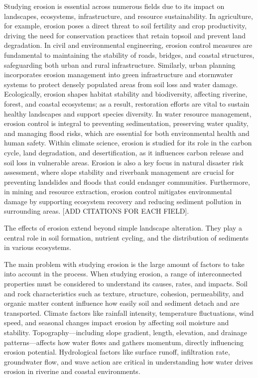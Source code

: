 Studying erosion is essential across numerous fields due to its impact on landscapes, ecosystems, infrastructure, and resource sustainability. In agriculture, for example, erosion poses a direct threat to soil fertility and crop productivity, driving the need for conservation practices that retain topsoil and prevent land degradation. In civil and environmental engineering, erosion control measures are fundamental to maintaining the stability of roads, bridges, and coastal structures, safeguarding both urban and rural infrastructure. Similarly, urban planning incorporates erosion management into green infrastructure and stormwater systems to protect densely populated areas from soil loss and water damage. Ecologically, erosion shapes habitat stability and biodiversity, affecting riverine, forest, and coastal ecosystems; as a result, restoration efforts are vital to sustain healthy landscapes and support species diversity. In water resource management, erosion control is integral to preventing sedimentation, preserving water quality, and managing flood risks, which are essential for both environmental health and human safety. Within climate science, erosion is studied for its role in the carbon cycle, land degradation, and desertification, as it influences carbon release and soil loss in vulnerable areas. Erosion is also a key focus in natural disaster risk assessment, where slope stability and riverbank management are crucial for preventing landslides and floods that could endanger communities. Furthermore, in mining and resource extraction, erosion control mitigates environmental damage by supporting ecosystem recovery and reducing sediment pollution in surrounding areas. [ADD CITATIONS FOR EACH FIELD].

The effects of erosion extend beyond simple landscape alteration. They play a central role in soil formation, nutrient cycling, and the distribution of sediments in various ecosystems.

The main problem with studying erosion is the large amount of factors to take into account in the process. When studying erosion, a range of interconnected properties must be considered to understand its causes, rates, and impacts. Soil and rock characteristics such as texture, structure, cohesion, permeability, and organic matter content influence how easily soil and sediment detach and are transported. Climate factors like rainfall intensity, temperature fluctuations, wind speed, and seasonal changes impact erosion by affecting soil moisture and stability. Topography—including slope gradient, length, elevation, and drainage patterns—affects how water flows and gathers momentum, directly influencing erosion potential. Hydrological factors like surface runoff, infiltration rate, groundwater flow, and wave action are critical in understanding how water drives erosion in riverine and coastal environments.

